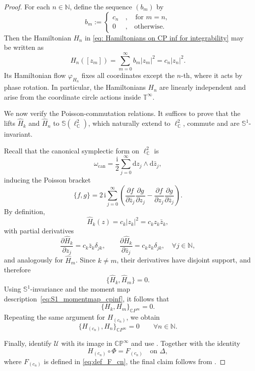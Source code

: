 \documentclass[12pt]{amsart}
\numberwithin{figure}{section}
\numberwithin{table}{section}
\numberwithin{equation}{section}
\def\i{\mathrm{i}}
\def\d{\mathrm{d}}
\begin{document}
\begin{proof}
For each \( n \in \mathbb{N} \), define the sequence \( (b_m) \) by
\[
b_m:=\begin{cases}
    c_n\, &, \quad \text{for } m=n,\\
    0\, &, \quad \text{otherwise.}
\end{cases}
\]
Then the Hamiltonian \(H_n\) in \eqref{eq: Hamiltonians on CP inf for integrability} may be written as
\[
H_n([z_m]) = \sum_{m=0}^{\infty}b_m |z_m|^2 = c_n|z_n|^2.
\]
Its Hamiltonian flow \( \varphi_{H_n} \) fixes all coordinates except the \( n \)-th, where it acts by phase rotation. In particular, the Hamiltonians \(H_n\) are linearly independent and arise from the coordinate circle actions inside \(\mathbb{T}^\infty\).

We now verify the Poisson-commutation relations. It suffices to prove that the lifts \(\hat{H}_k\) and \(\hat{H}_n\) to \(\mathbb{S}(\ell^2_{\mathbb{C}})\), which naturally extend to \(\ell^2_{\mathbb{C}}\), commute and are \(\mathbb{S}^1\)-invariant.

Recall that the canonical symplectic form on \(\ell^2_{\mathbb{C}}\) is
\[
\omega_{\mathrm{can}} = \frac{\i}{2} \sum_{j=0}^{\infty} \d z_j \wedge \d \bar{z}_j,
\]
inducing the Poisson bracket
\[
\{f, g\} = 2\,\i \sum_{j=0}^{\infty} \left( \frac{\partial f}{\partial \bar{z}_j} \frac{\partial g}{\partial z_j} - \frac{\partial f}{\partial z_j} \frac{\partial g}{\partial \bar{z}_j} \right).
\]
By definition,
\[
\hat{H}_k(z) = c_k |z_k|^2 = c_k z_k \bar{z}_k,
\]
with partial derivatives
\begin{equation*}
    \frac{\partial \hat{H}_k}{\partial z_j} = c_k \bar{z}_k \delta_{jk}, \qquad
    \frac{\partial \hat{H}_k}{\partial \bar{z}_j} = c_k z_k \delta_{jk}, \quad \forall j \in \mathbb{N},
\end{equation*}
and analogously for \(\hat{H}_m\). Since \(k\neq m\), their derivatives have disjoint support, and therefore
\[
\{ \hat{H}_k, \hat{H}_m \} = 0.
\]
Using \(\mathbb{S}^1\)-invariance and the moment map description~\eqref{eq:S1_momentmap_cpinf}, it follows that
\[
\{ H_k, H_m \}_{\mathbb{C}P^{\infty}} = 0.
\]
Repeating the same argument for \(H_{(c_n)}\), we obtain
\[
\{ H_{(c_n)}, H_n \}_{\mathbb{C}P^{\infty}} = 0
\qquad \forall n\in \mathbb{N}.
\]

Finally, identify \(\mathcal{U}\) with its image in \(\mathbb{CP}^\infty\) and use . Together with the identity
\[
H_{(c_n)} \circ \varPhi = F_{(c_n)} \quad \text{on } \Delta,
\]
where \( F_{(c_n)} \) is defined in \eqref{eq:def_F_cn}, the final claim follows from .
\end{proof}
\end{document}
